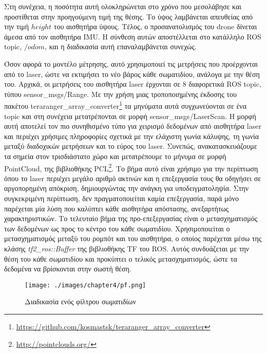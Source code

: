 Στη συνέχεια, η ποσότητα αυτή ολοκληρώνεται στο χρόνο που μεσολάβησε και προστίθεται στην προηγούμενη τιμή της θέσης. Το ύψος λαμβάνεται απευθείας από την τιμή $height$ του αισθητήρα ύψους. Τέλος, ο προσανατολισμός του drone δίνεται άμεσα από τον αισθητήρα IMU. Η σύνθεση αυτών αποστέλλεται στο κατάλληλο ROS topic, $/odom$, και η διαδικασία αυτή επαναλαμβάνεται συνεχώς.

Όσον αφορά το μοντέλο μέτρησης, αυτό χρησιμοποιεί τις μετρήσεις που προέρχονται από το laser, ώστε να εκτιμήσει το νέο βάρος κάθε σωματιδίου, ανάλογα με την θέση του. Αρχικά, οι μετρήσεις του αισθητήρα laser έρχονται σε 8 διαφορετικά ROS topic, τύπου sensor\_msgs/Range. Με την χρήση μιας τροποποιημένης έκδοσης του πακέτου teraranger\_array\_converter\footnote{\href{https://github.com/kosmastsk/teraranger\_array\_converter}{https://github.com/kosmastsk/teraranger\_array\_converter}} τα μηνύματα αυτά συγχωνεύονται σε ένα topic και στη συνέχεια μετατρέπονται σε μορφή sensor\_msgs/LaserScan. Η μορφή αυτή αποτελεί τον πιο συνηθισμένο τύπο για χειρισμό δεδομένων από αισθητήρα laser και περιέχει χρήσιμες πληροφορίες σχετικά με την ελάχιστη γωνία κάλυψης, τη γωνία μεταξύ διαδοχικών μετρήσεων και το εύρος του laser. Συνεπώς, ανακατασκευάζουμε τα σημεία στον τρισδιάστατο χώρο και μετατρέπουμε το μήνυμα σε μορφή PointCloud, της βιβλιοθήκης PCL\footnote{\href{http://pointclouds.org/}{http://pointclouds.org/}}. Το βήμα αυτό είναι χρήσιμο για την περίπτωση όπου το laser περιέχει μεγάλο αριθμό ακτινών και η επεξεργασία τους θα οδηγήσει σε αργοπορημένη απόκριση, δημιουργώντας την ανάγκη για υποδειγματοληψία. Στην συγκεκριμένη περίπτωση, δεν πραγματοποιείται καμία επεξεργασία, παρά μόνο παρέχεται μία λύση που καλύπτει κάθε αισθητήρα απόστασης, ανεξαρτήτως χαρακτηριστικών. Το τελευταίο βήμα της προ-επεξεργασίας είναι ο μετασχηματισμός των δεδομένων ως προς το κέντρο του κάθε σωματιδίου. Χρησιμοποιείται ο μετασχηματισμός μεταξύ του ρομπότ και του αισθητήρα, ο οποίος παρέχεται μέσω της κλάσης \emph{tf2\_ros::Buffer} της βιβλιοθήκης TF του ROS. Αυτός συνδυάζεται με την θέση του κάθε σωματιδίου και προκύπτει ο τελικός μετασχηματισμός, ώστε τα δεδομένα να βρίσκονται στην σωστή θέση.

\begin{figure}[!ht]
    \centering
    \texttt{[image: ./images/chapter4/pf.png]}
        \caption{Διαδικασία ενός φίλτρου σωματιδίων} 
    \label{fig:pf}
\end{figure}

